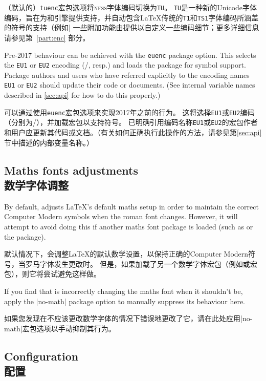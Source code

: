 \documentclass[a4paper]{l3doc}
\begin{document}
（默认的）\texttt{tuenc}宏包选项将\textsc{nfss}字体编码切换为\texttt{TU}。
\texttt{TU}是一种新的Unicode字体编码，旨在为\XeTeX 和\LuaTeX 引擎提供支持，并自动包含\LaTeX 传统的\texttt{T1}和\texttt{TS1}字体编码所涵盖的符号的支持（例如|%
一些附加功能由提供以自定义一些编码细节；更多详细信息请参见第~\vref{part:enc} 部分。

Pre-2017 behaviour can be achieved with the \texttt{euenc} package option.
This selects the \texttt{EU1} or \texttt{EU2} encoding (\XeTeX/\LuaTeX, resp.) and loads the  package for symbol support.
Package authors and users who have referred explicitly to the encoding names \texttt{EU1} or \texttt{EU2} should update their code or documents.
(See internal variable names described in \vref{sec:api} for how to do this properly.)

可以通过使用\texttt{euenc}宏包选项来实现2017年之前的行为。
这将选择\texttt{EU1}或\texttt{EU2}编码（分别为\XeTeX/\LuaTeX），并加载宏包以支持符号。
已明确引用编码名称\texttt{EU1}或\texttt{EU2}的宏包作者和用户应更新其代码或文档。（有关如何正确执行此操作的方法，请参见第\vref{sec:api}节中描述的内部变量名称。）

\subsection{Maths fonts adjustments\\数学字体调整}
By default,  adjusts \LaTeX's default maths setup in order to maintain the correct Computer Modern symbols when the roman font changes.
However, it will attempt to avoid doing this if another maths font package is loaded (such as  or the  package).

默认情况下，会调整\LaTeX 的默认数学设置，以保持正确的Computer Modern符号，当罗马字体发生更改时。
但是，如果加载了另一个数学字体宏包（例如或宏包），则它将尝试避免这样做。

If you find that  is incorrectly changing the maths font when it shouldn't be, apply the |no-math| package option to manually suppress its behaviour here.

如果您发现在不应该更改数学字体的情况下错误地更改了它，请在此处应用|no-math|宏包选项以手动抑制其行为。

\subsection{Configuration\\配置}
\label{sec:config}
\end{document}
